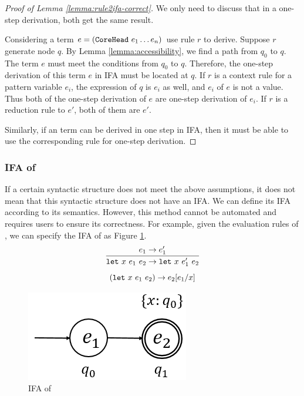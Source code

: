 \begin{proof}[Proof of Lemma \ref{lemma:rule2ifa-correct}]
We only need to discuss that in a one-step derivation, both get the same result.

Considering a term $e=(\mbox{\tt CoreHead}~e_1 \ldots e_n)$ use rule $r$ to derive. Suppose $r$ generate node $q$. By Lemma \ref{lemma:accessibility}, we find a path from $q_0$ to $q$. The term $e$ must meet the conditions from $q_0$ to $q$. Therefore, the one-step derivation of this term $e$ in IFA must be located at $q$. If $r$ is a context rule for a pattern variable $e_i$, the expression of $q$ is $e_i$ as well, and $e_i$ of $e$ is not a value. Thus both of the one-step derivation of $e$ are one-step derivation of $e_i$. If $r$ is a reduction rule to $e'$, both of them are $e'$.

Similarly, if an term can be derived in one step in IFA, then it must be able to use the corresponding rule for one-step derivation.
\end{proof}

\subsubsection{IFA of }

If a certain syntactic structure does not meet the above assumptions, it does not mean that this syntactic structure does not have an IFA. We can define its IFA according to its semantics. However, this method cannot be automated and requires users to ensure its correctness. For example, given the evaluation rules of , we can specify the IFA of  as Figure \ref{fig:ifa-let}.
\[
\infer{\m{let}~x~e_1~e_2 \to \m{let}~x~e_1'~e_2}{e_1 \to e_1'}
\]\[
(\mbox{\tt let}~x~e_1~e_2) \to e_2[e_1/x]
\]


\begin{figure}[t]
    \centering
    \includegraphics[scale=0.25]{images/ifa/ifa-let.png}
    \caption{IFA of }
    \label{fig:ifa-let}
\end{figure}

